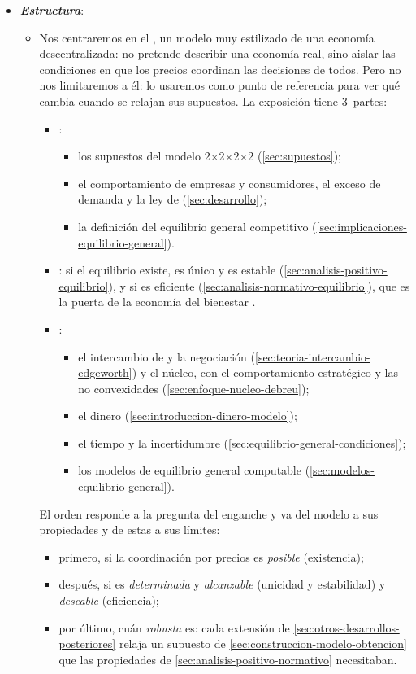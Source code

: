 \documentclass[11pt]{article}
\begin{document}
\begin{itemize}
\item \textbf{\emph{Estructura}}:
  \begin{itemize}
  \item Nos centraremos en el , un modelo muy estilizado de una economía descentralizada: no pretende describir una economía real, sino aislar las condiciones en que los precios coordinan las decisiones de todos. Pero no nos limitaremos a él: lo usaremos como punto de referencia para ver qué cambia cuando se relajan sus supuestos. La exposición tiene 3~partes:
  \begin{itemize}
  \item {}:
    \begin{itemize}
    \item los supuestos del modelo 2×2×2×2 (\ref{sec:supuestos});
    \item el comportamiento de empresas y consumidores, el exceso de demanda y la ley de  (\ref{sec:desarrollo});
    \item la definición del equilibrio general competitivo (\ref{sec:implicaciones-equilibrio-general}).
    \end{itemize}
  \item {}: si el equilibrio existe, es único y es estable (\ref{sec:analisis-positivo-equilibrio}), y si es eficiente (\ref{sec:analisis-normativo-equilibrio}), que es la puerta de la economía del bienestar .
  \item {}:
    \begin{itemize}
    \item el intercambio de  y la negociación (\ref{sec:teoria-intercambio-edgeworth}) y el núcleo, con el comportamiento estratégico y las no convexidades (\ref{sec:enfoque-nucleo-debreu});
    \item el dinero (\ref{sec:introduccion-dinero-modelo});
    \item el tiempo y la incertidumbre (\ref{sec:equilibrio-general-condiciones});
    \item los modelos de equilibrio general computable (\ref{sec:modelos-equilibrio-general}).
    \end{itemize}
  \end{itemize}
  El orden responde a la pregunta del enganche y va del modelo a sus propiedades y de estas a sus límites:
  \begin{itemize}
  \item primero, si la coordinación por precios es \emph{posible} (existencia);
  \item después, si es \emph{determinada} y \emph{alcanzable} (unicidad y estabilidad) y \emph{deseable} (eficiencia);
  \item por último, cuán \emph{robusta} es: cada extensión de \ref{sec:otros-desarrollos-posteriores} relaja un supuesto de \ref{sec:construccion-modelo-obtencion} que las propiedades de \ref{sec:analisis-positivo-normativo} necesitaban.
  \end{itemize}
  \end{itemize}
\end{itemize}
\end{document}
